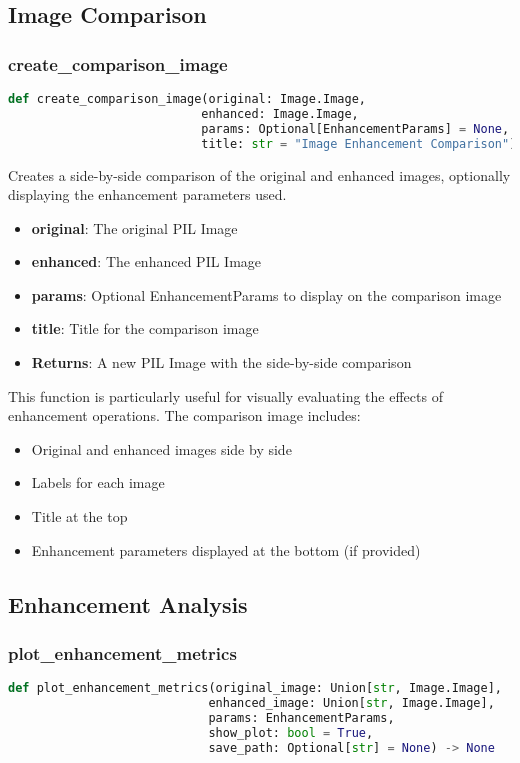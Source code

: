 \subsection{Image Comparison}

\subsubsection{create\_comparison\_image}
\begin{lstlisting}[language=Python]
def create_comparison_image(original: Image.Image, 
                           enhanced: Image.Image, 
                           params: Optional[EnhancementParams] = None,
                           title: str = "Image Enhancement Comparison") -> Image.Image
\end{lstlisting}

Creates a side-by-side comparison of the original and enhanced images, optionally displaying the enhancement parameters used.

\begin{itemize}
  \item \textbf{original}: The original PIL Image
  \item \textbf{enhanced}: The enhanced PIL Image
  \item \textbf{params}: Optional EnhancementParams to display on the comparison image
  \item \textbf{title}: Title for the comparison image
  \item \textbf{Returns}: A new PIL Image with the side-by-side comparison
\end{itemize}

This function is particularly useful for visually evaluating the effects of enhancement operations. The comparison image includes:
\begin{itemize}
  \item Original and enhanced images side by side
  \item Labels for each image
  \item Title at the top
  \item Enhancement parameters displayed at the bottom (if provided)
\end{itemize}

\subsection{Enhancement Analysis}

\subsubsection{plot\_enhancement\_metrics}
\begin{lstlisting}[language=Python]
def plot_enhancement_metrics(original_image: Union[str, Image.Image], 
                            enhanced_image: Union[str, Image.Image],
                            params: EnhancementParams,
                            show_plot: bool = True,
                            save_path: Optional[str] = None) -> None
\end{lstlisting}

